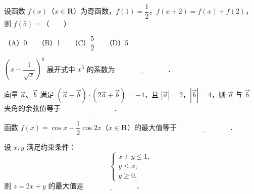 \begin{question}
设函数 $f(x)$（$x\in\mathbf{R}$）为奇函数，$f(1)=\dfrac{1}{2}$，$f(x+2)=f(x)+f(2)$，则 $f(5)=$\mbox{（　　）}

（A）0　　（B）1　　（C）$\dfrac{5}{2}$　　（D）5

\end{question}

\begin{question}
$\left(x-\dfrac{1}{\sqrt{x}}\right)^8$ 展开式中 $x^5$ 的系数为 $\underline{\hspace{3cm}}$．

\end{question}
\begin{question}
向量 $\vec{a}$、$\vec{b}$ 满足 $(\vec{a}-\vec{b})\cdot(2\vec{a}+\vec{b})=-4$，且 $|\vec{a}|=2$，$|\vec{b}|=4$，则 $\vec{a}$ 与 $\vec{b}$ 夹角的余弦值等于 $\underline{\hspace{3cm}}$．

\end{question}
\begin{question}
函数 $f(x)=\cos x-\dfrac{1}{2}\cos 2x$（$x\in\mathbf{R}$）的最大值等于 $\underline{\hspace{3cm}}$．

\end{question}
\begin{question}
设 $x,y$ 满足约束条件：
\nopagebreak[4]
\[
\begin{cases}
x+y\leqslant 1,\\
y\leqslant x,\\
y\geqslant 0,
\end{cases}
\]
则 $z=2x+y$ 的最大值是 $\underline{\hspace{3cm}}$．

\end{question}

